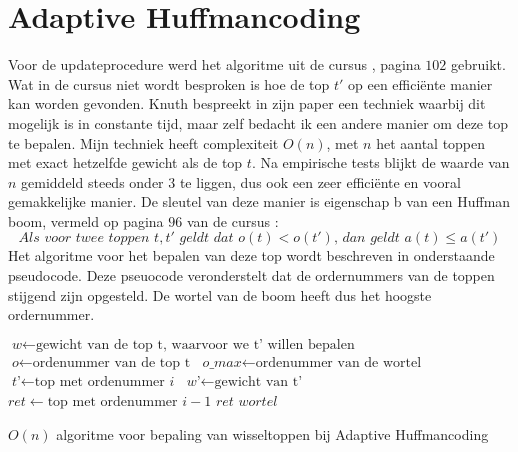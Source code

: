\section{Adaptive Huffmancoding}
Voor de updateprocedure werd het algoritme uit de cursus \cite{ad3cursus}, pagina $102$ gebruikt. Wat in de cursus niet wordt besproken is hoe de top $t'$ op een effici\"ente manier kan worden gevonden. Knuth bespreekt in zijn paper \cite{knuthhuffman} een techniek waarbij dit mogelijk is in constante tijd, maar zelf bedacht ik een andere manier om deze top te bepalen. Mijn techniek heeft complexiteit $O(n)$, met $n$ het aantal toppen met exact hetzelfde gewicht als de top $t$. Na empirische tests blijkt de waarde van $n$ gemiddeld steeds onder $3$ te liggen, dus ook een zeer effici\"ente en vooral gemakkelijke manier. De sleutel van deze manier is eigenschap b van een Huffman boom, vermeld op pagina $96$ van de cursus \cite{ad3cursus}:
$$\textit{Als voor twee toppen }t, t'\textit{ geldt dat }o(t) < o(t')\textit{, dan geldt }a(t) \leq a(t')$$
Het algoritme voor het bepalen van deze top wordt beschreven in onderstaande pseudocode. Deze pseuocode veronderstelt dat de ordernummers van de toppen stijgend zijn opgesteld. De wortel van de boom heeft dus het hoogste ordernummer.
\begin{algorithm}
	\begin{algorithmic}[1]
		\State $\textit{w} \gets \text{gewicht van de top t, waarvoor we t' willen bepalen}$
		\State $\textit{o} \gets \text{ordenummer van de top t}$
		\State $\textit{o\_max} \gets \text{ordenummer van de wortel}$
			\State $\textit{t'} \gets \text{top met ordenummer }\textit{i}$
			\State $\textit{w'} \gets \text{gewicht van t'}$
				\State $\textit{ret} \gets \text{top met ordenummer } i-1$
				\Return $\textit{ret}$
			\EndIf
		\EndFor
		\Return $\textit{wortel}$
		\EndProcedure
	\end{algorithmic}
	\caption{$O(n)$ algoritme voor bepaling van wisseltoppen bij Adaptive Huffmancoding}
\end{algorithm}
